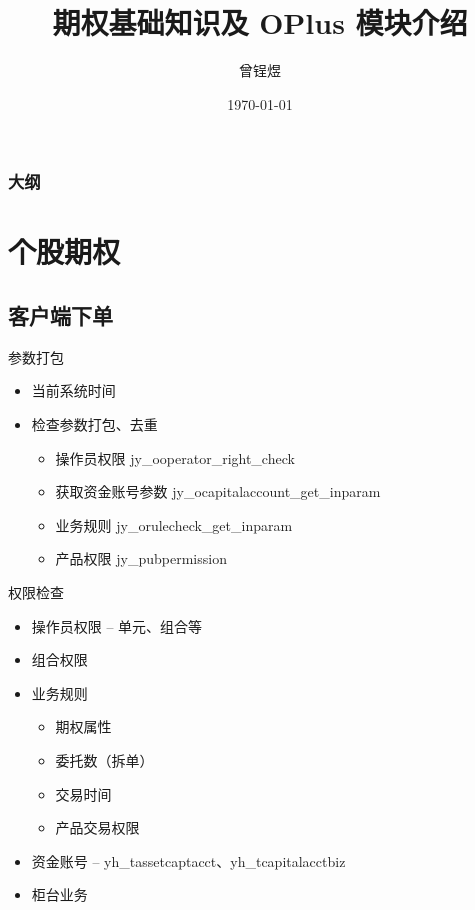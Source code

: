 \documentclass[12pt]{ctexbeamer}	%
\title[期权知识分享]{期权基础知识及 OPlus 模块介绍}	%
\author[Zengyu Zeng]{曾锃煜}
\institute[Hundsun]{资管，研发四部}	%
\date{\today}
\begin{document}
\begin{frame}
\titlepage
\end{frame}


\begin{frame}
\frametitle{大纲}
\tableofcontents
\end{frame}


\section{个股期权}


\subsection{客户端下单}

\begin{frame}{参数打包}
  \begin{itemize} %
    \item 当前系统时间
    \item 检查参数打包、去重
    \begin{itemize}
      \item 操作员权限 jy\_ooperator\_right\_check
      \item 获取资金账号参数 jy\_ocapitalaccount\_get\_inparam
      \item 业务规则 jy\_orulecheck\_get\_inparam
      \item 产品权限 jy\_pubpermission
    \end{itemize}
  \end{itemize}
\end{frame}

\begin{frame}{权限检查}
  \begin{itemize}
    \item 操作员权限 -- 单元、组合等
    \item 组合权限
    \item 业务规则
    \begin{itemize}
      \item 期权属性
      \item 委托数（拆单）
      \item 交易时间
      \item 产品交易权限
    \end{itemize}
    \item 资金账号 -- yh\_tassetcaptacct、yh\_tcapitalacctbiz
    \item 柜台业务
  \end{itemize}
\end{frame}
\end{document}
